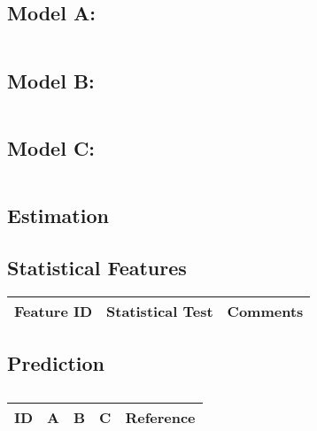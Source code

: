 \subsection{Model A:}

\begin{equation}
\end{equation}

\subsection{Model B:}

\begin{equation}
\end{equation}

\subsection{Model C:}

\begin{equation}
\end{equation}

\subsection{Estimation}

\subsection{Statistical Features}

\begin{table}[H]\centering
	\begin{tabular}{p{1cm}p{4cm}p{3cm}}
		Feature ID & Statistical Test & Comments\\
		\hline
		\hline
	\end{tabular}
\end{table}

\subsection{Prediction}

\centering
\begin{table}[H]\footnotesize
	\caption{}
	\begin{tabular}{rp{1cm}p{2cm}p{3cm}p{1cm}}
		\hline
		ID & A & B & C & Reference \\
		\hline
		\hline
	\end{tabular}
\end{table}
\raggedright

